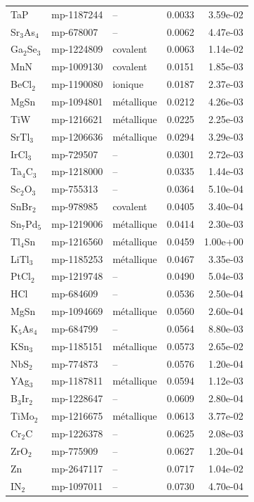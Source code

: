 \begin{longtable}{@{}l l l r r@{}}
TaP & mp-1187244 & -- & 0.0033 & 3.59e-02 \\
Sr$_{3}$As$_{4}$ & mp-678007 & -- & 0.0062 & 4.47e-03 \\
Ga$_{2}$Se$_{3}$ & mp-1224809 & covalent & 0.0063 & 1.14e-02 \\
MnN & mp-1009130 & covalent & 0.0151 & 1.85e-03 \\
BeCl$_{2}$ & mp-1190080 & ionique & 0.0187 & 2.37e-03 \\
MgSn & mp-1094801 & m\'etallique & 0.0212 & 4.26e-03 \\
TiW & mp-1216621 & m\'etallique & 0.0225 & 2.25e-03 \\
SrTl$_{3}$ & mp-1206636 & m\'etallique & 0.0294 & 3.29e-03 \\
IrCl$_{3}$ & mp-729507 & -- & 0.0301 & 2.72e-03 \\
Ta$_{4}$C$_{3}$ & mp-1218000 & -- & 0.0335 & 1.44e-03 \\
Sc$_{2}$O$_{3}$ & mp-755313 & -- & 0.0364 & 5.10e-04 \\
SnBr$_{2}$ & mp-978985 & covalent & 0.0405 & 3.40e-04 \\
Sn$_{7}$Pd$_{5}$ & mp-1219006 & m\'etallique & 0.0414 & 2.30e-03 \\
Tl$_{4}$Sn & mp-1216560 & m\'etallique & 0.0459 & 1.00e+00 \\
LiTl$_{3}$ & mp-1185253 & m\'etallique & 0.0467 & 3.35e-03 \\
PtCl$_{2}$ & mp-1219748 & -- & 0.0490 & 5.04e-03 \\
HCl & mp-684609 & -- & 0.0536 & 2.50e-04 \\
MgSn & mp-1094669 & m\'etallique & 0.0560 & 2.60e-04 \\
K$_{5}$As$_{4}$ & mp-684799 & -- & 0.0564 & 8.80e-03 \\
KSn$_{3}$ & mp-1185151 & m\'etallique & 0.0573 & 2.65e-02 \\
NbS$_{2}$ & mp-774873 & -- & 0.0576 & 1.20e-04 \\
YAg$_{3}$ & mp-1187811 & m\'etallique & 0.0594 & 1.12e-03 \\
B$_{3}$Ir$_{2}$ & mp-1228647 & -- & 0.0609 & 2.80e-04 \\
TiMo$_{2}$ & mp-1216675 & m\'etallique & 0.0613 & 3.77e-02 \\
Cr$_{2}$C & mp-1226378 & -- & 0.0625 & 2.08e-03 \\
ZrO$_{2}$ & mp-775909 & -- & 0.0627 & 1.20e-04 \\
Zn & mp-2647117 & -- & 0.0717 & 1.04e-02 \\
IN$_{2}$ & mp-1097011 & -- & 0.0730 & 4.70e-04 \\

\end{longtable}
